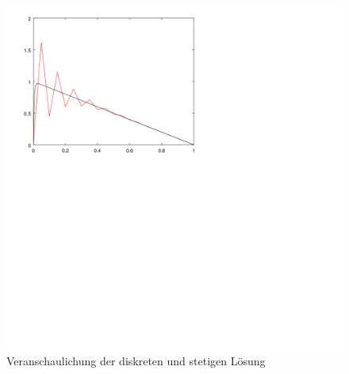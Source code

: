 \begin{enumerate}
\begin{figure}[h!]
  \centering
  \includegraphics[scale=0.4]{1_oscillating.png}



  \caption{Veranschaulichung der diskreten und stetigen Lösung}
  \label{fig:oscillations}
\end{figure}


\end{enumerate}
